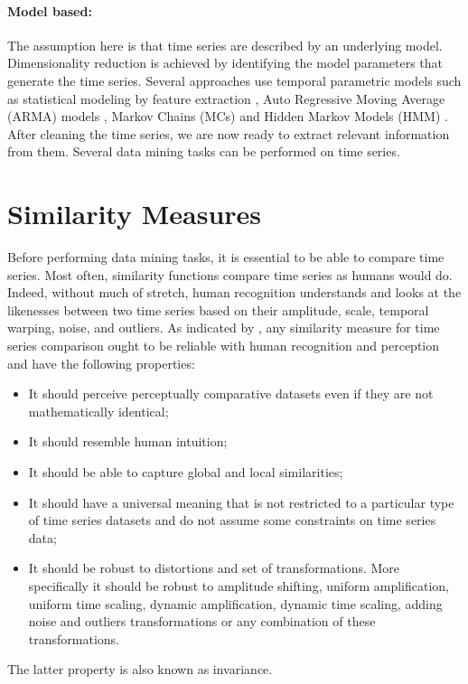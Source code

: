 \paragraph{Model based:} The assumption here is that time series are described by an underlying model.  Dimensionality reduction is achieved by identifying the model parameters that generate the time series. Several approaches use temporal parametric models such as statistical modeling by feature extraction \cite{Esling2012}, Auto Regressive Moving Average (ARMA) models \cite{kalpakis2001distance}, Markov Chains (MCs) and Hidden Markov Models (HMM) \cite{panuccio2002hidden}.
\\

After cleaning the time series, we are now ready to extract relevant information from them. Several data mining tasks can be performed on time series.

\section{Similarity Measures}

Before performing data mining tasks, it is essential to be able to compare time series. Most often,  similarity functions compare time series as humans would do. Indeed, without much of stretch, human recognition understands and looks at the likenesses between two time series based on their amplitude, scale, temporal warping, noise, and outliers. As indicated by \cite{fu2011review}  \cite{ralanamahatana2005mining}  \cite{Esling2012}, any similarity measure  for time series comparison ought to be reliable with human recognition and perception and have the following properties:


\begin{itemize}
\item It should perceive perceptually comparative datasets even if  they are not mathematically identical;
\item It should resemble human intuition;
\item It should be able to capture global and local similarities;
\item It should have a universal meaning that is not restricted to a particular type of time series datasets and do not assume some constraints on time series data;
\item It should be robust to distortions and set of transformations. More specifically it should be robust to amplitude
shifting, uniform amplification, uniform time scaling, dynamic amplification, dynamic time scaling, adding noise and outliers transformations or any combination of these transformations.
\end{itemize}
The latter property is also known as invariance.

